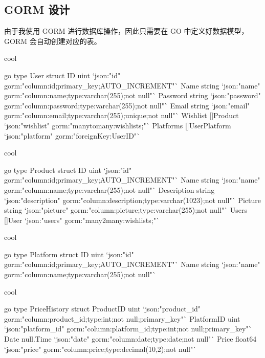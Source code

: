\subsection{GORM 设计}

由于我使用 GORM 进行数据库操作，因此只需要在 GO 中定义好数据模型，GORM 会自动创建对应的表。

\begin{codebox}{}{cool}
\begin{amzcode}{go}
type User struct {
    ID        uint           `json:"id" gorm:"column:id;primary_key;AUTO_INCREMENT"`
    Name      string         `json:"name" gorm:"column:name;type:varchar(255);not null"`
    Password  string         `json:"password" gorm:"column:password;type:varchar(255);not null"`
    Email     string         `json:"email" gorm:"column:email;type:varchar(255);unique;not null"`
    Wishlist  []Product      `json:"wishlist" gorm:"manytomany:wishlists;"`
    Platforms []UserPlatform `json:"platform" gorm:"foreignKey:UserID"`
}
\end{amzcode}
\end{codebox}

\begin{codebox}{}{cool}
\begin{amzcode}{go}
type Product struct {
    ID          uint   `json:"id" gorm:"column:id;primary_key;AUTO_INCREMENT"`
    Name        string `json:"name" gorm:"column:name;type:varchar(255);not null"`
    Description string `json:"description" gorm:"column:description;type:varchar(1023);not null"`
    Picture     string `json:"picture" gorm:"column:picture;type:varchar(255);not null"`
    Users       []User `json:"users" gorm:"many2many:wishlists;"`
}

\end{amzcode}
\end{codebox}

\begin{codebox}{}{cool}
\begin{amzcode}{go}
type Platform struct {
    ID   uint   `json:"id" gorm:"column:id;primary_key;AUTO_INCREMENT"`
    Name string `json:"name" gorm:"column:name;type:varchar(255);not null"`
}
\end{amzcode}
\end{codebox}

\begin{codebox}{}{cool}
\begin{amzcode}{go}
type PriceHistory struct {
    ProductID  uint      `json:"product_id" gorm:"column:product_id;type:int;not null;primary_key"`
    PlatformID uint      `json:"platform_id" gorm:"column:platform_id;type:int;not null;primary_key"`
    Date       null.Time `json:"date" gorm:"column:date;type:date;not null"`
    Price      float64   `json:"price" gorm:"column:price;type:decimal(10,2);not null"`
}
\end{amzcode}
\end{codebox}

